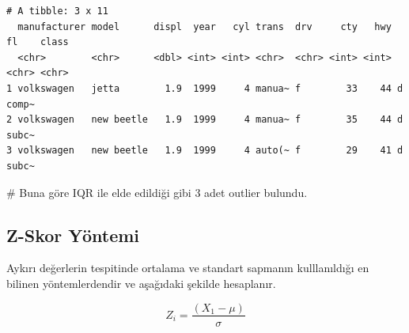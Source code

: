 \documentclass[
  letterpaper,
  DIV=11,
  numbers=noendperiod]{scrreprt}
\newenvironment{Shaded}{\begin{snugshade}}{\end{snugshade}}
\newcommand{\CommentTok}[1]{\textcolor[rgb]{0.37,0.37,0.37}{#1}}
\newcommand{\FloatTok}[1]{\textcolor[rgb]{0.68,0.00,0.00}{#1}}
\newcommand{\FunctionTok}[1]{\textcolor[rgb]{0.28,0.35,0.67}{#1}}
\newcommand{\NormalTok}[1]{\textcolor[rgb]{0.00,0.23,0.31}{#1}}
\newcommand{\OtherTok}[1]{\textcolor[rgb]{0.00,0.23,0.31}{#1}}
\newcommand{\SpecialCharTok}[1]{\textcolor[rgb]{0.37,0.37,0.37}{#1}}
\begin{document}
\begin{Shaded}
\end{Shaded}

\begin{verbatim}
# A tibble: 3 x 11
  manufacturer model      displ  year   cyl trans  drv     cty   hwy fl    class
  <chr>        <chr>      <dbl> <int> <int> <chr>  <chr> <int> <int> <chr> <chr>
1 volkswagen   jetta        1.9  1999     4 manua~ f        33    44 d     comp~
2 volkswagen   new beetle   1.9  1999     4 manua~ f        35    44 d     subc~
3 volkswagen   new beetle   1.9  1999     4 auto(~ f        29    41 d     subc~
\end{verbatim}

\begin{Shaded}
\begin{Highlighting}[]
\CommentTok{\# Buna göre IQR ile elde edildiği gibi 3 adet outlier bulundu.}
\end{Highlighting}
\end{Shaded}

\subsection*{Z-Skor Yöntemi}\label{z-skor-yuxf6ntemi}

Aykırı değerlerin tespitinde ortalama ve standart sapmanın kulllanıldığı
en bilinen yöntemlerdendir ve aşağıdaki şekilde hesaplanır.

\[
Z_i = \frac{(X_1-\mu)}{\sigma}
\]
\end{document}
